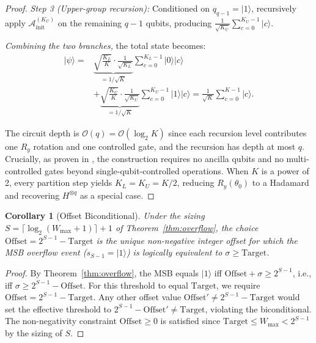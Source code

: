 \documentclass{ieeeaccess}
\newtheorem{corollary}[theorem]{Corollary}
\begin{document}
\begin{proof}
\textit{Step 3 (Upper-group recursion):} Conditioned on $q_{q-1} = |1\rangle$, recursively apply $\mathcal{A}_{\mathrm{init}}^{(K_U)}$ on the remaining $q{-}1$ qubits, producing $\frac{1}{\sqrt{K_U}} \sum_{c=0}^{K_U-1} |c\rangle$.

\textit{Combining the two branches,} the total state becomes:
\begin{equation}
\begin{split}
|\psi\rangle = & \underbrace{\sqrt{\frac{K_L}{K}} \cdot \frac{1}{\sqrt{K_L}}}_{= 1/\sqrt{K}} \sum_{c=0}^{K_L-1} |0\rangle|c\rangle \\
& + \underbrace{\sqrt{\frac{K_U}{K}} \cdot \frac{1}{\sqrt{K_U}}}_{= 1/\sqrt{K}} \sum_{c=0}^{K_U-1} |1\rangle|c\rangle = \frac{1}{\sqrt{K}} \sum_{c=0}^{K-1} |c\rangle.
\end{split}
\end{equation}

The circuit depth is $\mathcal{O}(q) = \mathcal{O}(\log_2 K)$ since each recursion level contributes one $R_y$ rotation and one controlled gate, and the recursion has depth at most $q$. Crucially, as proven in \cite[Theorem~1]{shukla2024}, the construction requires no ancilla qubits and no multi-controlled gates beyond single-qubit-controlled operations. When $K$ is a power of 2, every partition step yields $K_L = K_U = K/2$, reducing $R_y(\theta_0)$ to a Hadamard and recovering $H^{\otimes q}$ as a special case.
\end{proof}

\begin{corollary}[Offset Biconditional]
\label{cor:offset}
Under the sizing $S = \lceil \log_2(W_{\max} + 1) \rceil + 1$ of Theorem~\ref{thm:overflow}, the choice $\mathrm{Offset} = 2^{S-1} - \mathrm{Target}$ is the unique non-negative integer offset for which the MSB overflow event ($s_{S-1} = |1\rangle$) is logically equivalent to $\sigma \ge \mathrm{Target}$.
\end{corollary}

\begin{proof}
By Theorem~\ref{thm:overflow}, the MSB equals $|1\rangle$ iff $\mathrm{Offset} + \sigma \ge 2^{S-1}$, i.e., iff $\sigma \ge 2^{S-1} - \mathrm{Offset}$. For this threshold to equal $\mathrm{Target}$, we require $\mathrm{Offset} = 2^{S-1} - \mathrm{Target}$. Any other offset value $\mathrm{Offset}' \neq 2^{S-1} - \mathrm{Target}$ would set the effective threshold to $2^{S-1} - \mathrm{Offset}' \neq \mathrm{Target}$, violating the biconditional. The non-negativity constraint $\mathrm{Offset} \ge 0$ is satisfied since $\mathrm{Target} \le W_{\max} < 2^{S-1}$ by the sizing of $S$.
\end{proof}
\end{document}
